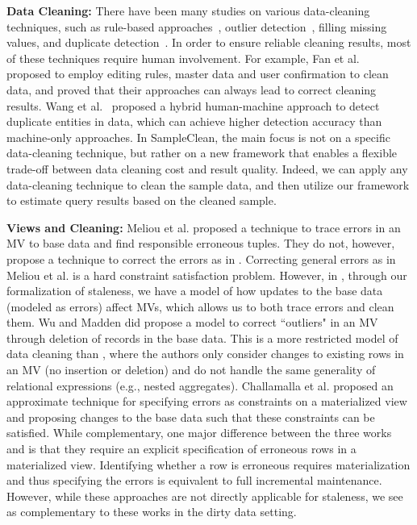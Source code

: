 {\noindent \bf Data Cleaning:} There have been many studies on various data-cleaning techniques, such as rule-based approaches~\cite{fan2012foundations,DBLP:conf/sigmod/DallachiesaEEEIOT13}, outlier detection~\cite{hellerstein2008quantitative,dasu2003exploratory}, filling missing values, and duplicate detection~\cite{conf/hdkm/Christen08, DBLP:conf/kdd/BilenkoM03, wang2012crowder}. In order to ensure reliable cleaning results, most of these techniques require human involvement.
For example, Fan et al.~\cite{DBLP:journals/pvldb/FanLMTY10} proposed to employ editing rules, master data and user confirmation to clean data, and proved that their approaches can always lead to correct cleaning results. Wang et al.~\cite{wang2012crowder} proposed a hybrid human-machine approach to detect duplicate entities in data, which can achieve higher detection accuracy than machine-only approaches. 
In SampleClean, the main focus is not on a specific data-cleaning technique, but rather on a new framework that enables a flexible trade-off between data cleaning cost and result quality.
Indeed, we can apply any data-cleaning technique to clean the sample data, and then utilize our framework to estimate query results based on the cleaned sample. 

\vspace{.5em}

{\noindent \bf Views and Cleaning:} Meliou et al. \cite{DBLP:conf/sigmod/MeliouGNS11} proposed a technique to trace errors in an MV to base data and find responsible erroneous tuples. 
They do not, however, propose a technique to correct the errors as in \svc.
Correcting general errors as in Meliou et al. is a hard constraint satisfaction problem.
However, in \svc, through our formalization of staleness, we have a model of how updates to the base data (modeled as errors) affect MVs, which allows us to both trace errors and clean them.
Wu and Madden \cite{DBLP:journals/pvldb/0002M13} did propose a model to correct ``outliers" in an MV through deletion of records in the base data.
This is a more restricted model of data cleaning than \svc, where the authors only consider changes to existing rows in an MV (no insertion or deletion) and do not handle the same generality of relational expressions (e.g., nested aggregates).
Challamalla et al. \cite{DBLP:conf/sigmod/ChalamallaIOP14} proposed an approximate technique for specifying errors as constraints on a materialized view and proposing changes to the base data such that these constraints can be satisfied.
While complementary, one major difference between the three works \cite{DBLP:conf/sigmod/MeliouGNS11, DBLP:journals/pvldb/0002M13, DBLP:conf/sigmod/ChalamallaIOP14} and \svc is that they require an explicit specification of erroneous rows in a materialized view.
Identifying whether a row is erroneous requires materialization and thus specifying the errors is equivalent to full incremental maintenance. 
However, while these approaches are not directly applicable for staleness, we see \svc as complementary to these works in the dirty data setting. 
